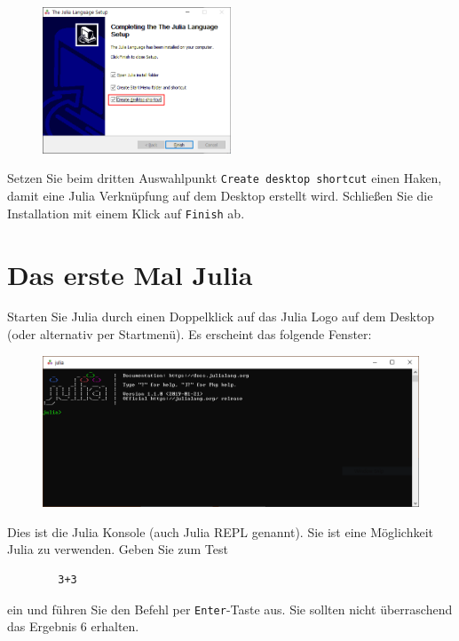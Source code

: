 \documentclass[11pt, a4paper]{scrartcl}
\begin{document}
	\begin{figure}[h!]
	\centering
	\includegraphics[width=0.5\textwidth]{imgs/install_finish.png}
	\end{figure}

	Setzen Sie beim dritten Auswahlpunkt \texttt{Create desktop shortcut} einen Haken, damit eine Julia Verknüpfung auf dem Desktop erstellt wird. Schließen Sie die Installation mit einem Klick auf \texttt{Finish} ab.
	
	\newpage
	\section{Das erste Mal Julia}
	Starten Sie Julia durch einen Doppelklick auf das Julia Logo auf dem Desktop (oder alternativ per Startmenü). Es erscheint das folgende Fenster:
	
	\begin{figure}[h!]
	\centering
	\includegraphics[width=\textwidth]{imgs/julia_REPL.png}
	\end{figure}

	Dies ist die Julia Konsole (auch Julia REPL genannt). Sie ist eine Möglichkeit Julia zu verwenden. Geben Sie zum Test
	
	\begin{lstlisting}
		3+3
	\end{lstlisting}
	
	ein und führen Sie den Befehl per \texttt{Enter}-Taste aus. Sie sollten nicht überraschend das Ergebnis 6 erhalten.
	
\end{document}
